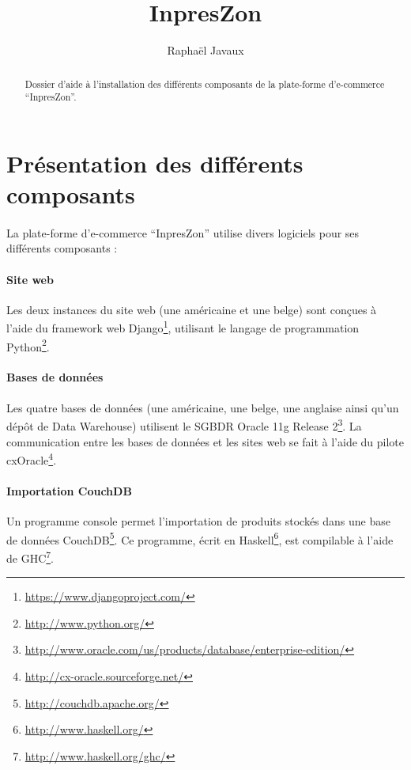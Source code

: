 \documentclass[a4paper,12pt,french]{article}
\title{InpresZon}
\author{Raphaël Javaux}
\date{}
\begin{document}
\maketitle 

\begin{abstract}
   Dossier d'aide à l'installation des différents composants de la plate-forme
d'e-commerce \enquote{InpresZon}.
\end{abstract}

\tableofcontents

\newpage

\section{Présentation des différents composants}

    \paragraph{}
    La plate-forme d'e-commerce \enquote{InpresZon} utilise divers logiciels
pour ses différents composants :

    \paragraph{Site web}
    Les deux instances du site web (une américaine et une belge) sont conçues à
l'aide du framework web Django\footnote{\url{https://www.djangoproject.com/}},
utilisant le langage de programmation
Python\footnote{\url{http://www.python.org/}}. 

    \paragraph{Bases de données}
    Les quatre bases de données (une américaine, une belge, une anglaise ainsi
qu'un dépôt de Data Warehouse) utilisent le SGBDR Oracle 11g Release
2\footnote{\url{
http://www.oracle.com/us/products/database/enterprise-edition/}}. La
communication entre les bases de données et les sites web se fait à l'aide du
pilote cxOracle\footnote{\url{http://cx-oracle.sourceforge.net/}}.

    \paragraph{Importation CouchDB}
    Un programme console permet l'importation de produits stockés dans une base
de données CouchDB\footnote{\url{http://couchdb.apache.org/}}. Ce programme,
écrit en Haskell\footnote{\url{http://www.haskell.org/}}, est compilable à
l'aide de GHC\footnote{\url{http://www.haskell.org/ghc/}}.
\end{document}
